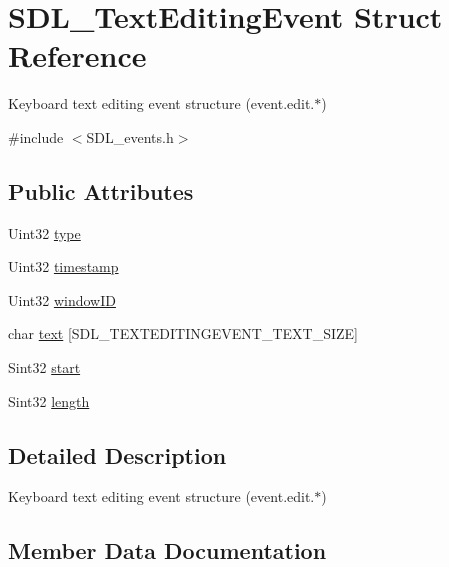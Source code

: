 \hypertarget{structSDL__TextEditingEvent}{}\section{S\+D\+L\+\_\+\+Text\+Editing\+Event Struct Reference}
\label{structSDL__TextEditingEvent}


Keyboard text editing event structure (event.\+edit.$\ast$)  




{\ttfamily \#include $<$S\+D\+L\+\_\+events.\+h$>$}

\subsection*{Public Attributes}
\begin{DoxyCompactItemize}
\item 
Uint32 \hyperlink{structSDL__TextEditingEvent_a198e6df194a3bf12cf5f82553e84c7cb}{type}
\item 
Uint32 \hyperlink{structSDL__TextEditingEvent_afc164f40abee6fd8e72e01b589210c75}{timestamp}
\item 
Uint32 \hyperlink{structSDL__TextEditingEvent_a23b3e414cf7a7ccc547b7595ca930049}{window\+ID}
\item 
char \hyperlink{structSDL__TextEditingEvent_a29848c2e7819ea98ae8fb08543e6d420}{text} \mbox{[}S\+D\+L\+\_\+\+T\+E\+X\+T\+E\+D\+I\+T\+I\+N\+G\+E\+V\+E\+N\+T\+\_\+\+T\+E\+X\+T\+\_\+\+S\+I\+ZE\mbox{]}
\item 
Sint32 \hyperlink{structSDL__TextEditingEvent_ac6c6a00835d92b12c0ba5b78b5ad676d}{start}
\item 
Sint32 \hyperlink{structSDL__TextEditingEvent_adca95505c0bf212834930df58f6d1aa5}{length}
\end{DoxyCompactItemize}


\subsection{Detailed Description}
Keyboard text editing event structure (event.\+edit.$\ast$) 

\subsection{Member Data Documentation}
\mbox{\label{structSDL__TextEditingEvent_adca95505c0bf212834930df58f6d1aa5}} 

